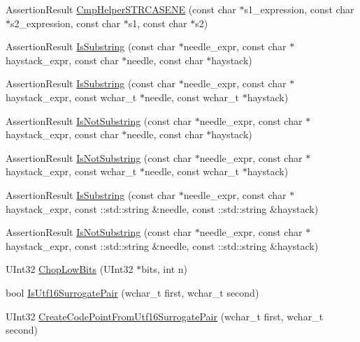 \begin{DoxyCompactItemize}
\item 
\-Assertion\-Result \hyperlink{namespacetesting_1_1internal_a87ee06a47690ee4681d40e1bf6a4a3c5}{\-Cmp\-Helper\-S\-T\-R\-C\-A\-S\-E\-N\-E} (const char $\ast$s1\-\_\-expression, const char $\ast$s2\-\_\-expression, const char $\ast$s1, const char $\ast$s2)
\item 
\-Assertion\-Result \hyperlink{namespacetesting_aa47c8fed5266f284499c1c82dd0e167e}{\-Is\-Substring} (const char $\ast$needle\-\_\-expr, const char $\ast$haystack\-\_\-expr, const char $\ast$needle, const char $\ast$haystack)
\item 
\-Assertion\-Result \hyperlink{namespacetesting_a9b82c8fa11b142a504c9d30fa3ed3ccb}{\-Is\-Substring} (const char $\ast$needle\-\_\-expr, const char $\ast$haystack\-\_\-expr, const wchar\-\_\-t $\ast$needle, const wchar\-\_\-t $\ast$haystack)
\item 
\-Assertion\-Result \hyperlink{namespacetesting_aeb4296c0ab6b8b4bb90dd7b28369f601}{\-Is\-Not\-Substring} (const char $\ast$needle\-\_\-expr, const char $\ast$haystack\-\_\-expr, const char $\ast$needle, const char $\ast$haystack)
\item 
\-Assertion\-Result \hyperlink{namespacetesting_ae7bf7bebcf58a8ade5f13be1c274db1d}{\-Is\-Not\-Substring} (const char $\ast$needle\-\_\-expr, const char $\ast$haystack\-\_\-expr, const wchar\-\_\-t $\ast$needle, const wchar\-\_\-t $\ast$haystack)
\item 
\-Assertion\-Result \hyperlink{namespacetesting_af277c788bf038cc9fd0baf33862f693d}{\-Is\-Substring} (const char $\ast$needle\-\_\-expr, const char $\ast$haystack\-\_\-expr, const \-::std\-::string \&needle, const \-::std\-::string \&haystack)
\item 
\-Assertion\-Result \hyperlink{namespacetesting_a82240dc86e7ace0508ad37a2ac7f019b}{\-Is\-Not\-Substring} (const char $\ast$needle\-\_\-expr, const char $\ast$haystack\-\_\-expr, const \-::std\-::string \&needle, const \-::std\-::string \&haystack)
\item 
\-U\-Int32 \hyperlink{namespacetesting_1_1internal_ae5b8a7eede03981fb212e2a48bccea26}{\-Chop\-Low\-Bits} (\-U\-Int32 $\ast$bits, int n)
\item 
bool \hyperlink{namespacetesting_1_1internal_a5295827a346d31a82436982e915b70fb}{\-Is\-Utf16\-Surrogate\-Pair} (wchar\-\_\-t first, wchar\-\_\-t second)
\item 
\-U\-Int32 \hyperlink{namespacetesting_1_1internal_a5148378e34622f080776dafb62a40a44}{\-Create\-Code\-Point\-From\-Utf16\-Surrogate\-Pair} (wchar\-\_\-t first, wchar\-\_\-t second)

\end{DoxyCompactItemize}
